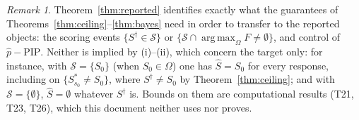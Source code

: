 \documentclass[11pt]{article}
\theoremstyle{remark}
\newtheorem{remark}[theorem]{Remark}
\newcommand{\PIP}{\mathrm{PIP}}
\newcommand{\sS}{\mathcal S}
\DeclareMathOperator*{\argmax}{arg\,max}
\begin{document}
\begin{remark}
Theorem~\ref{thm:reported} identifies exactly what the guarantees of Theorems~\ref{thm:ceiling}--\ref{thm:bayes} need in order to transfer to the reported objects: the scoring events $\{S^\dagger\in\sS\}$ or $\{\sS\cap\argmax_\Omega F\ne\emptyset\}$, and control of $\hat p-\PIP$. Neither is implied by (i)--(ii), which concern the target only: for instance, with $\sS=\{S_0\}$ (when $S_0\in\Omega$) one has $\hat S=S_0$ for every response, including on $\{S^*_{s_0}\ne S_0\}$, where $S^\dagger\ne S_0$ by Theorem~\ref{thm:ceiling}; and with $\sS=\{\emptyset\}$, $\hat S=\emptyset$ whatever $S^\dagger$ is. Bounds on them are computational results (T21, T23, T26), which this document neither uses nor proves.
\end{remark}
\end{document}
